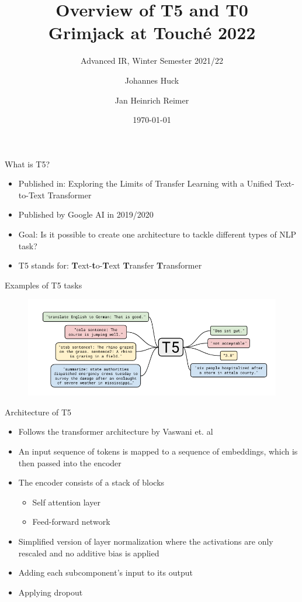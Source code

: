 \documentclass[english]{mlutalk}
\title{Overview of T5 and T0\\Grimjack at Touché 2022}
\subtitle{Advanced IR, Winter Semester 2021/22}
\author{Johannes Huck \and Jan Heinrich Reimer}
\institute{Martin Luther University Halle-Wittenberg}
\date{\today}
\begin{document}
\titleframe

\begin{frame}{What is T5?~\cite{RaffelSRLNMZLL2020}}
  \begin{itemize}
    \item Published in: Exploring the Limits of Transfer Learning with a Unified
    Text-to-Text Transformer
    \item Published by Google AI in 2019/2020
    \item Goal: Is it possible to create one architecture to tackle different types of NLP task? 
    \item T5 stands for: \textbf{T}ext-\textbf{t}o-\textbf{T}ext \textbf{T}ransfer \textbf{T}ransformer
  \end{itemize}
\end{frame}


\begin{frame}{Examples of T5 tasks}
  \begin{figure}
      \center
      \includegraphics[scale=0.45]{figures/t5-examples.png}
  \end{figure}
\end{frame}

\begin{frame}{Architecture of T5}
    \begin{itemize}
      \item Follows the transformer architecture by Vaswani et. al~\cite{VaswaniSPUJGKP2017}
      \item An input sequence of tokens is mapped to
      a sequence of embeddings, which is then passed into the encoder
      \item The encoder consists of a stack of blocks
      \begin{itemize}
        \item Self attention layer
        \item Feed-forward network
      \end{itemize}
      \item Simplified version of layer normalization where
      the activations are only rescaled and no additive bias is applied
      \item Adding each subcomponent’s input to its output
      \item Applying dropout
    \end{itemize}
\end{frame}
\end{document}
